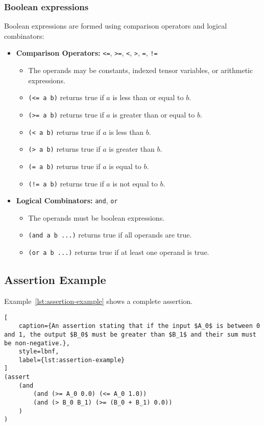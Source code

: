 \subsubsection*{Boolean expressions}
Boolean expressions are formed using comparison operators and logical combinators:
\begin{itemize}
    \item \textbf{Comparison Operators:} \texttt{<=}, \texttt{>=}, \texttt{<}, \texttt{>}, \texttt{=}, \texttt{!=}
    \begin{itemize}
        \item The operands may be constants, indexed tensor variables, or arithmetic expressions.
        \item \texttt{(<= a b)} returns true if $a$ is less than or equal to $b$.
        \item \texttt{(>= a b)} returns true if $a$ is greater than or equal to $b$.
        \item \texttt{(< a b)} returns true if $a$ is less than $b$.
        \item \texttt{(> a b)} returns true if $a$ is greater than $b$.
        \item \texttt{(= a b)} returns true if $a$ is equal to $b$.
        \item \texttt{(!= a b)} returns true if $a$ is not equal to $b$.
    \end{itemize}
    \item \textbf{Logical Combinators:} \texttt{and}, \texttt{or}
    \begin{itemize}
        \item The operands must be boolean expressions.
        \item \texttt{(and a b ...)} returns true if all operands are true.
        \item \texttt{(or a b ...)} returns true if at least one operand is true.
    \end{itemize}
\end{itemize}

\subsection*{Assertion Example}
Example~\ref{lst:assertion-example} shows a complete assertion.

\begin{lstlisting}[
    caption={An assertion stating that if the input $A_0$ is between 0 and 1, the output $B_0$ must be greater than $B_1$ and their sum must be non-negative.},
    style=lbnf,
    label={lst:assertion-example}
]
(assert
    (and
        (and (>= A_0 0.0) (<= A_0 1.0))
        (and (> B_0 B_1) (>= (B_0 + B_1) 0.0))
    )
)
\end{lstlisting}

